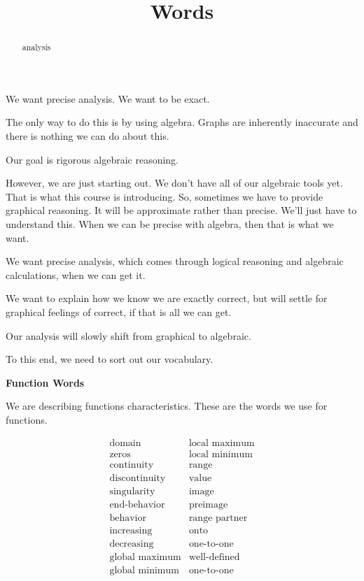 \documentclass{ximera}
\title{Words}
\begin{document}
\begin{abstract}
analysis
\end{abstract}
\maketitle














We want precise analysis.  We want to be exact. 


The only way to do this is by using algebra.  Graphs are inherently inaccurate and there is nothing we can do about this. 


Our goal is rigorous algebraic reasoning. 



However, we are just starting out.  We don't have all of our algebraic tools yet.  That is what this course is introducing.  So, sometimes we have to provide graphical reasoning.  It will be approximate rather than precise.  We'll just have to understand this.  When we can be precise with algebra, then that is what we want. 


We want precise analysis, which comes through logical reasoning and algebraic calculations, when we can get it. 


We want to explain how we know we are exactly correct, but will settle for graphical feelings of correct, if that is all we can get. 

Our analysis will slowly shift from graphical to algebraic.


To this end, we need to sort out our vocabulary.


\textbf{\textcolor{red!75!green}{Function Words}}

We are describing functions characteristics. These are the words we use for functions.


\[
\begin{array}{ll}
\text{domain}  & \text{local maximum}  \\
\text{zeros}  & \text{local minimum} \\
\text{continuity}    &  \text{range} \\
\text{discontinuity}  & \text{value} \\
\text{singularity}   & \text{image} \\
\text{end-behavior} & \text{preimage} \\
\text{behavior} & \text{range partner} \\
\text{increasing} & \text{onto} \\
\text{decreasing} &  \text{one-to-one} \\
\text{global maximum} &  \text{well-defined} \\
\text{global minimum} &  \text{one-to-one} 

\end{array}
\]
\end{document}
